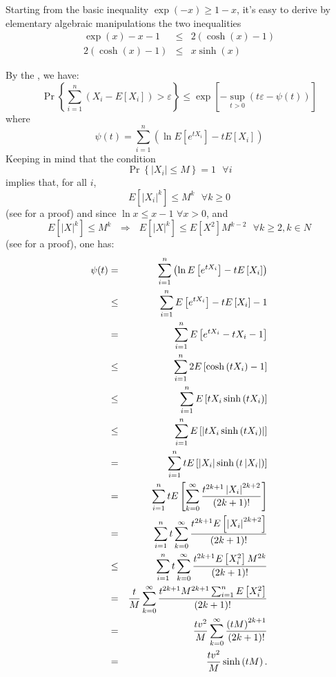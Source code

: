 \documentclass{article}
\begin{document}
Starting from the basic inequality $\exp \left( -x\right) \geq 1-x$, it's
easy to derive by elementary algebraic manipulations the two inequalities
\begin{eqnarray*}
\exp \left( x\right) -x-1 &\leq &2\left( \cosh \left( x\right) -1\right) \\
2\left( \cosh \left( x\right) -1\right) &\leq &x\sinh \left( x\right)
\end{eqnarray*}

By the , we have:
\[
\Pr\left\{ \sum_{i=1}^{n}\left( X_{i}-E[X_{i}]\right) >\varepsilon \right\}
\leq \exp \left[ -\sup_{t>0}\left( t\varepsilon -\psi (t)\right) \right] 
\]
where
\[
\psi (t)=\sum_{i=1}^{n}\left( \ln E\left[ e^{tX_{i}}\right] -tE\left[ X_{i}%
\right] \right) 
\]
Keeping in mind that the condition
\[
\Pr\left\{ \left\vert X_{i}\right\vert \leq M\right\} =1\text{ \ }\forall i
\]
implies that, for all $i$,
\[
E[\left\vert X_{i}\right\vert ^{k}]\leq M^{k} \text{ \ }\forall k\geq 0
\]
(see  for a proof) and since $\ln x\leq x-1$ $\forall x>0$, and%
\[
E[\left\vert X\right\vert ^{k}]\leq M^{k}\text{ \ }\Longrightarrow \text{ \ }%
E\left[ \left\vert X\right\vert ^{k}\right] \leq E\left[ X^{2}\right] M^{k-2}%
\text{ \ \ \ \ \ \ \ }\forall k\geq 2,k\in N
\]
(see  for a proof), one has:
\begin{eqnarray*}
\psi (t) &=&\sum_{i=1}^{n}\left( \ln E\left[ e^{tX_{i}}\right] -tE\left[
X_{i}\right] \right)  \\
&\leq &\sum_{i=1}^{n}E\left[ e^{tX_{i}}\right] -tE\left[ X_{i}\right] -1 \\
&=&\sum_{i=1}^{n}E\left[ e^{tX_{i}}-tX_{i}-1\right]  \\
&\leq &\sum_{i=1}^{n}2E\left[ \cosh \left( tX_{i}\right) -1\right]  \\
&\leq &\sum_{i=1}^{n}E\left[ tX_{i}\sinh \left( tX_{i}\right) \right]  \\
&\leq &\sum_{i=1}^{n}E\left[ \left\vert tX_{i}\sinh \left( tX_{i}\right)
\right\vert \right]  \\
&=&\sum_{i=1}^{n}tE\left[ \left\vert X_{i}\right\vert \sinh \left(
t\left\vert X_{i}\right\vert \right) \right]  \\
&=&\sum_{i=1}^{n}tE\left[ \sum_{k=0}^{\infty }\frac{t^{2k+1}\left\vert
X_{i}\right\vert ^{2k+2}}{\left( 2k+1\right) !}\right]  \\
&=&\sum_{i=1}^{n}t\sum_{k=0}^{\infty }\frac{t^{2k+1}E\left[ \left\vert
X_{i}\right\vert ^{2k+2}\right] }{\left( 2k+1\right) !} \\
&\leq &\sum_{i=1}^{n}t\sum_{k=0}^{\infty }\frac{t^{2k+1}E\left[ X_{i}^{2}%
\right] M^{2k}}{\left( 2k+1\right) !} \\
&=&\frac{t}{M}\sum_{k=0}^{\infty }\frac{t^{2k+1}M^{2k+1}\sum_{i=1}^{n}E\left[
X_{i}^{2}\right] }{\left( 2k+1\right) !} \\
&=&\frac{tv^{2}}{M}\sum_{k=0}^{\infty }\frac{\left( tM\right) ^{2k+1}}{%
\left( 2k+1\right) !} \\
&=&\frac{tv^{2}}{M}\sinh \left( tM\right) .
\end{eqnarray*}
\end{document}

